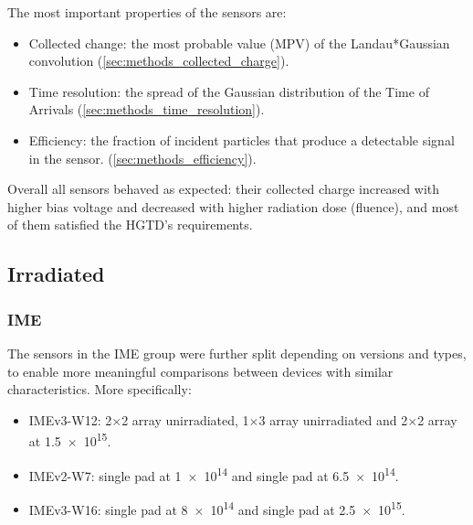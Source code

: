 The most important properties of the sensors are:

\begin{itemize}
    \item Collected change: the most probable value (MPV) of the Landau*Gaussian convolution (\ref{sec:methods_collected_charge}).
    \item Time resolution: the spread of the Gaussian distribution of the Time of Arrivals (\ref{sec:methods_time_resolution}).
    \item Efficiency: the fraction of incident particles that produce a detectable signal in the sensor. (\ref{sec:methods_efficiency}).
\end{itemize}

Overall all sensors behaved as expected: their collected charge increased with higher bias voltage and decreased with higher radiation dose (fluence), and most of them satisfied the HGTD's requirements.

\subsection{Irradiated}

\subsubsection{IME}

The sensors in the IME group were further split depending on versions and types, to enable more meaningful comparisons between devices with similar characteristics. More specifically:

\begin{itemize}
    \item IMEv3-W12: 2\(\times\)2 array unirradiated, 1\(\times\)3 array unirradiated and 2\(\times\)2 array at \qty{1.5e15}{\neutroneq}.
    \item IMEv2-W7: single pad at \qty{1e14}{\neutroneq} and single pad at \qty{6.5e14}{\neutroneq}.
    \item IMEv3-W16: single pad at \qty{8e14}{\neutroneq} and single pad at \qty{2.5e15}{\neutroneq}.
\end{itemize}

